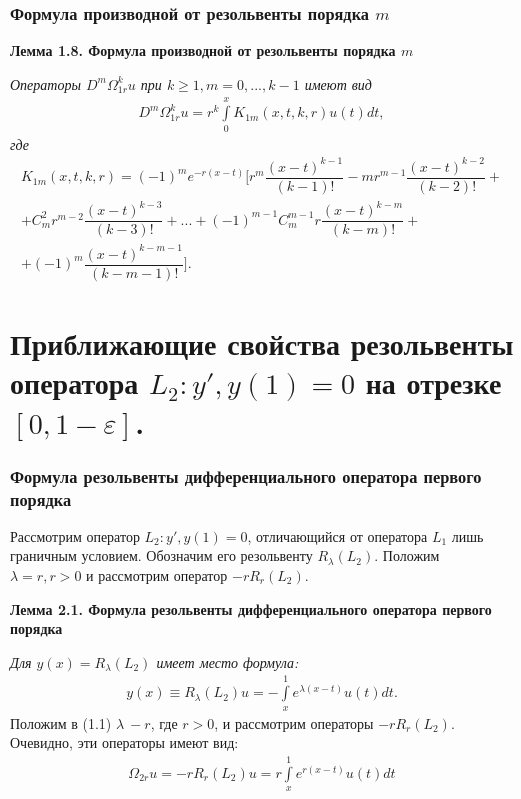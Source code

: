\documentclass[10pt,utf8,presentation,notheorems]{beamer}
\theoremstyle{plain}
\theoremstyle{definition}
\begin{document}
\begin{frame}
\frametitle{Формула производной от резольвенты порядка $ m $}

\label{lemma1.8}
\textbf{Лемма 1.8. Формула производной от резольвенты порядка $ m $}

\textit{Операторы $ D^m\Omega_{1r}^ku $ при $ k \geq 1, m = 0,...,k-1 $ имеют вид}
\begin{equation}
\begin{array}{c}
D^m\Omega_{1r}^ku = r^k\int\limits_0^x K_{1m}(x,t,k,r)u(t)dt,
\end{array}
\end{equation}
\textit{где}
\begin{equation}
\begin{array}{c}
K_{1m}(x,t,k,r) = (-1)^me^{-r(x-t)} \biggl[r^m\dfrac{(x-t)^{k-1}}{(k-1)!} - mr^{m-1}\dfrac{(x-t)^{k-2}}{(k-2)!} + \\ + C_m^2r^{m-2}\dfrac{(x-t)^{k-3}}{(k-3)!} + ... + (-1)^{m-1}C_m^{m-1}r\dfrac{(x-t)^{k-m}}{(k-m)!} + \\ 
+ (-1)^m\dfrac{(x-t)^{k-m-1}}{(k-m-1)!}\biggr].
\end{array}
\end{equation}
\end{frame}

\section{Приближающие свойства резольвенты оператора $ L_2:y', y(1)=0 $ на отрезке $ [0, 1 - \varepsilon] $.}

\begin{frame}
\frametitle{Формула резольвенты дифференциального оператора первого порядка}
Рассмотрим оператор $ L_2: y', y(1) = 0 $, отличающийся от оператора $ L_1 $ лишь граничным условием.
Обозначим его резольвенту $R_\lambda(L_2)$. Положим $ \lambda = r, r > 0 $ и рассмотрим оператор $ -rR_r(L_2) $.

\label{lemma2.1}
\textbf{Лемма 2.1. Формула резольвенты дифференциального оператора первого порядка}

\textit{Для $ y(x) = R_\lambda(L_2) $ имеет место формула:}
\begin{equation}
\begin{array}{c}
y(x) \equiv R_\lambda(L_2)u = -\int\limits_x^1 e^{\lambda (x-t)}u(t)dt.
\end{array}
\end{equation}
Положим в (1.1) $ \lambda \ -r $, где $ r > 0 $, и рассмотрим операторы $ -rR_{r}(L_2)$. Очевидно, эти операторы имеют вид:
\begin{equation}
\begin{array}{c}
\Omega_{2r}u = -rR_{r}(L_2)u = r \int\limits_x^1 e^{r(x-t)}u(t)dt
\end{array}
\end{equation}
\end{frame}
\end{document}
